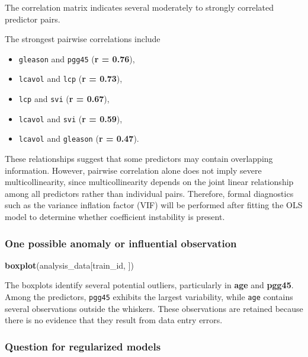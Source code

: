 \documentclass[
  11pt,
]{article}
\newenvironment{Shaded}{\begin{snugshade}}{\end{snugshade}}
\newcommand{\FunctionTok}[1]{\textcolor[rgb]{0.13,0.29,0.53}{\textbf{#1}}}
\newcommand{\NormalTok}[1]{#1}
\providecommand{\tightlist}{%
  \setlength{\itemsep}{0pt}\setlength{\parskip}{0pt}}
\begin{document}
The correlation matrix indicates several moderately to strongly
correlated predictor pairs.

The strongest pairwise correlations include

\begin{itemize}
\tightlist
\item
  \texttt{gleason} and \texttt{pgg45} (\textbf{r = 0.76}),
\item
  \texttt{lcavol} and \texttt{lcp} (\textbf{r = 0.73}),
\item
  \texttt{lcp} and \texttt{svi} (\textbf{r = 0.67}),
\item
  \texttt{lcavol} and \texttt{svi} (\textbf{r = 0.59}),
\item
  \texttt{lcavol} and \texttt{gleason} (\textbf{r = 0.47}).
\end{itemize}

These relationships suggest that some predictors may contain overlapping
information. However, pairwise correlation alone does not imply severe
multicollinearity, since multicollinearity depends on the joint linear
relationship among all predictors rather than individual pairs.
Therefore, formal diagnostics such as the variance inflation factor
(VIF) will be performed after fitting the OLS model to determine whether
coefficient instability is present.

\subsubsection{One possible anomaly or influential
observation}\label{one-possible-anomaly-or-influential-observation}

\begin{Shaded}
\begin{Highlighting}[]
\FunctionTok{boxplot}\NormalTok{(analysis\_data[train\_id, ])}
\end{Highlighting}
\end{Shaded}

The boxplots identify several potential outliers, particularly in
\textbf{age} and \textbf{pgg45}. Among the predictors, \texttt{pgg45}
exhibits the largest variability, while \texttt{age} contains several
observations outside the whiskers. These observations are retained
because there is no evidence that they result from data entry errors.

\subsubsection{Question for regularized
models}\label{question-for-regularized-models}
\end{document}
